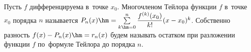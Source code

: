 
    Пусть $f$ дифференцируема в~точке $x_0$. Многочленом Тейлора функции $f$ в~точке $x_0$ порядка $n$ называется $P_n(x)\hm=\sum\limits_{k\hm=0}^n
    \dfrac{f^{(k)}(x_0)}{k!}(x-x_0)^k$. Собственно разность $f(x)-P_n(x)\hm=r_n(x)$ будем называть остатком при разложении функции $f$ по~формуле Тейлора до порядка $n$.
